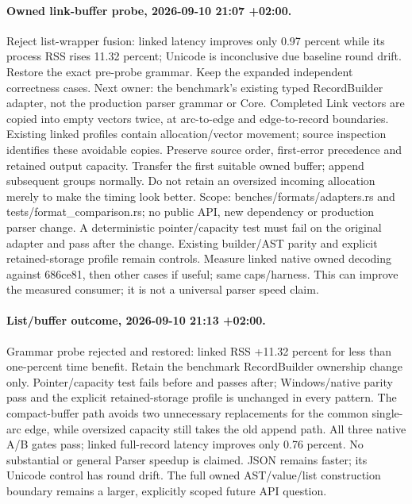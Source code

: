 \documentclass[11pt,a4paper]{article}
\begin{document}
\paragraph{Owned link-buffer probe, 2026-09-10 21:07 +02:00.}
Reject list-wrapper fusion: linked latency improves only 0.97 percent while its
process RSS rises 11.32 percent; Unicode is inconclusive due baseline round drift.
Restore the exact pre-probe grammar. Keep the expanded independent correctness cases.
Next owner: the benchmark's existing typed RecordBuilder adapter, not the production
parser grammar or Core. Completed Link vectors are copied into empty vectors twice,
at arc-to-edge and edge-to-record boundaries. Existing linked profiles contain
allocation/vector movement; source inspection identifies these avoidable copies.
Preserve source order, first-error precedence and retained output capacity. Transfer
the first suitable owned buffer; append subsequent groups normally. Do not retain
an oversized incoming allocation merely to make the timing look better.
Scope: benches/formats/adapters.rs and tests/format\_comparison.rs; no public API,
new dependency or production parser change. A deterministic pointer/capacity test
must fail on the original adapter and pass after the change. Existing builder/AST
parity and explicit retained-storage profile remain controls. Measure linked native
owned decoding against 686ce81, then other cases if useful; same caps/harness.
This can improve the measured consumer; it is not a universal parser speed claim.


\paragraph{List/buffer outcome, 2026-09-10 21:13 +02:00.}
Grammar probe rejected and restored: linked RSS +11.32 percent for less than
one-percent time benefit. Retain the benchmark RecordBuilder ownership change
only. Pointer/capacity test fails before and passes after; Windows/native parity
pass and the explicit retained-storage profile is unchanged in every pattern.
The compact-buffer path avoids two unnecessary replacements for the common
single-arc edge, while oversized capacity still takes the old append path.
All three native A/B gates pass; linked full-record latency improves only
0.76 percent. No substantial or general Parser speedup is claimed. JSON remains
faster; its Unicode control has round drift. The full owned AST/value/list
construction boundary remains a larger, explicitly scoped future API question.
\end{document}

